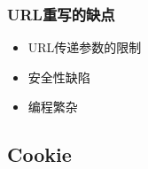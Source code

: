 \begin{frame}[fragile] %
  \frametitle{URL重写的缺点}

  \begin{itemize}
  \item URL传递参数的限制
  \item 安全性缺陷
  \item 编程繁杂
  \end{itemize}
\end{frame}


\subsection{Cookie}

